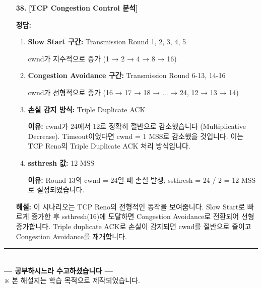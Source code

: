 \documentclass[a4paper, 10pt]{article}
\begin{document}
\begin{enumerate}[itemsep=2.5em, leftmargin=2em, label={}]
\item[\textbf{38.}] \textbf{[TCP Congestion Control 분석]}
\vspace{0.5em}

\noindent\textbf{정답:}

\begin{enumerate}[label=\alph*., itemsep=0.3em]
    \item \textbf{Slow Start 구간:} Transmission Round 1, 2, 3, 4, 5

    cwnd가 지수적으로 증가 (1 → 2 → 4 → 8 → 16)

    \item \textbf{Congestion Avoidance 구간:} Transmission Round 6-13, 14-16

    cwnd가 선형적으로 증가 (16 → 17 → 18 → ... → 24, 12 → 13 → 14)

    \item \textbf{손실 감지 방식:} Triple Duplicate ACK

    \textbf{이유:} cwnd가 24에서 12로 정확히 절반으로 감소했습니다 (Multiplicative Decrease). Timeout이었다면 cwnd = 1 MSS로 감소했을 것입니다. 이는 TCP Reno의 Triple Duplicate ACK 처리 방식입니다.

    \item \textbf{ssthresh 값:} 12 MSS

    \textbf{이유:} Round 13의 cwnd = 24일 때 손실 발생, ssthresh = 24 / 2 = 12 MSS로 설정되었습니다.
\end{enumerate}

\small\textbf{해설:} 이 시나리오는 TCP Reno의 전형적인 동작을 보여줍니다. Slow Start로 빠르게 증가한 후 ssthresh(16)에 도달하면 Congestion Avoidance로 전환되어 선형 증가합니다. Triple duplicate ACK로 손실이 감지되면 cwnd를 절반으로 줄이고 Congestion Avoidance를 재개합니다.

\end{enumerate}

\vfill
\begin{center}
  \rule{0.9\textwidth}{0.4pt}\\[8pt]
  {\small\textbf{--- 공부하시느라 수고하셨습니다 ---}}\\[6pt]
  {\scriptsize ※ 본 해설지는 학습 목적으로 제작되었습니다.}
\end{center}
\end{document}
